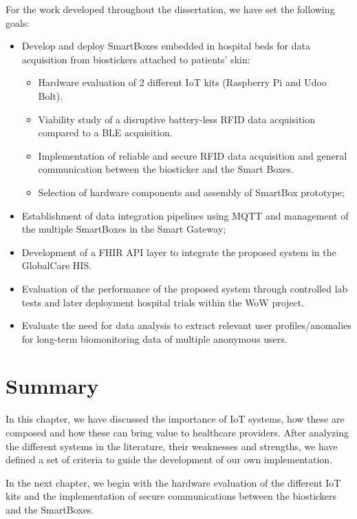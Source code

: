 
For the work developed throughout the dissertation, we have set the following goals: 

\begin{itemize}
    \item Develop and deploy SmartBoxes embedded in hospital beds for data acquisition from biostickers attached to patients’ skin:
    \begin{itemize}
        \item Hardware evaluation of 2 different \acs{IoT} kits (Raspberry Pi and Udoo Bolt).
        \item Viability study of a disruptive battery-less \acs{RFID} data acquisition compared to a \acs{BLE} acquisition.
        \item Implementation of reliable and secure \acs{RFID} data acquisition and general communication between the biosticker and the Smart Boxes.
        \item Selection of hardware components and assembly of SmartBox prototype;
    \end{itemize}
    \item Establishment of data integration pipelines using \acs{MQTT} and management of the multiple SmartBoxes in the Smart Gateway;
    \item Development of a \acs{FHIR} \acs{API} layer to integrate the proposed system in the GlobalCare \acs{HIS}.
    \item Evaluation of the performance of the proposed system through controlled lab tests and later deployment hospital trials within the WoW project.
    \item Evaluate the need for data analysis to extract relevant user profiles/anomalies for long-term biomonitoring data of multiple anonymous users.
\end{itemize}

\section{Summary}
In this chapter, we have discussed the importance of \acs{IoT} systems, how these are composed and how these can bring value to healthcare providers. After analyzing the different systems in the literature, their weaknesses and strengths, we have defined a set of criteria to guide the development of our own implementation.

\bigskip

In the next chapter, we begin with the hardware evaluation of the different \acs{IoT} kits and the implementation of secure communications between the biostickers and the SmartBoxes. 

